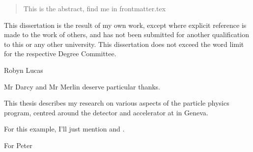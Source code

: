 
\begin{abstract}%
  This is the abstract, find me in frontmatter.tex
\end{abstract}


\begin{declaration}
  This dissertation is the result of my own work, except where explicit
  reference is made to the work of others, and has not been submitted
  for another qualification to this or any other university. This
  dissertation does not exceed the word limit for the respective Degree
  Committee.
  \vspace*{1cm}
  \begin{flushright}
   Robyn Lucas 
  \end{flushright}
\end{declaration}


\begin{acknowledgements}
  Mr Darcy and Mr Merlin deserve particular thanks.
\end{acknowledgements}


\begin{preface}
  This thesis describes my research on various aspects of the \CMS
  particle physics program, centred around the \CMS detector and \LHC
  accelerator at \CERN in Geneva.

  \noindent
  For this example, I'll just mention 
  and .
\end{preface}

\tableofcontents

\frontquote%
  {For Peter}%
  {}
